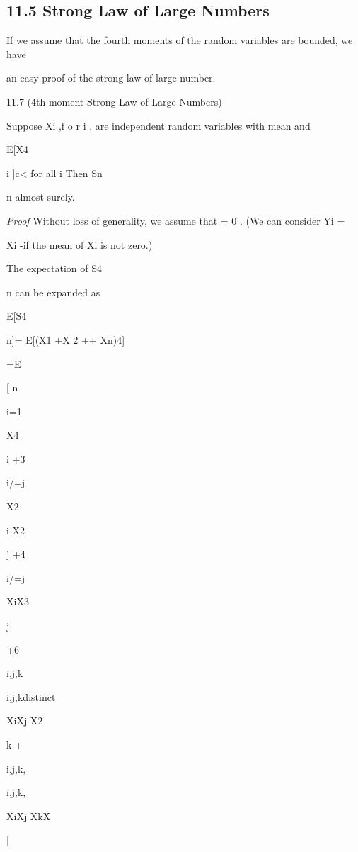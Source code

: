 \subsection*{11.5 Strong Law of Large Numbers}

If we assume that the fourth moments of the random variables are bounded, we have

an easy proof of the strong law of large number.

\begin{thmbox}{11.7 (4th-moment Strong Law of Large Numbers)}
\end{thmbox}

Suppose Xi ,f o r i , are independent random variables with mean \mu and

E[X4

i ]\leq c< \infty for all i Then Sn

n \to \mu almost surely.

\textit{Proof} Without loss of generality, we assume that \mu= 0 . (We can consider Yi =

Xi -\mu if the mean of Xi is not zero.)

The expectation of S4

n can be expanded as

E[S4

n]= E[(X1 +X 2 +\cdot\cdot\cdot+ Xn)4]

=E

[ n\sum

i=1

X4

i +3

\sum

i/=j

X2

i X2

j +4

\sum

i/=j

XiX3

j

+6

\sum

i,j,k

i,j,kdistinct

XiXj X2

k +

\sum

i,j,k,\ell

i,j,k,\elldistinct

XiXj XkX\ell

]

